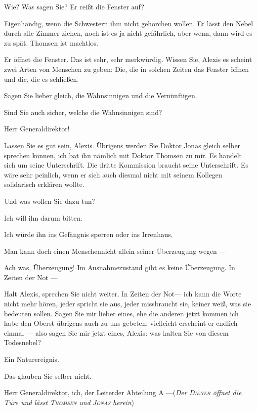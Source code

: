 \documentclass[
	final,
	a4paper,
	ngerman,
	mpinclude = true, %
	twoside = true,
	open = right,
	cleardoublepage = plain,
	DIV = 13,
	BCOR = 1cm,
	titlepage = firstiscover,
	]{scrbook}
\newcommand{\direction}[1]{(\textit{#1})}
\newcommand{\thecharacter}[1]{\textup{\textsc{#1}}\xspace}
\newcommand{\theAlexis}{\thecharacter{Alexis}}
\newcommand{\theThomsen}{\thecharacter{Thomsen}}
\newcommand{\theJonas}{\thecharacter{Jonas}}
\newcommand{\theDiener}{\thecharacter{Diener}}
\newcommand{\character}[1]{\item[#1]}
\newcommand{\Generaldirektor}{\character{Direktor}}
\newcommand{\Alexis}{\character{\theAlexis}}
\begin{document}
\begin{play}
\Generaldirektor
Wie? Was sagen Sie? Er reißt die Fenster auf?

\Alexis
Eigenhändig, wenn die Schwestern ihm nicht gehorchen wollen. Er lässt den Nebel durch alle Zimmer ziehen, noch ist es ja nicht gefährlich, aber wenn, dann wird es zu spät. Thomsen ist machtlos.

\Generaldirektor
Er öffnet die Fenster. Das ist sehr, sehr merkwürdig. Wissen Sie, Alexis es scheint zwei Arten von Menschen zu geben: Die, die in solchen Zeiten das Fenster öffnen und die, die es schließen.

\Alexis
Sagen Sie lieber gleich, die Wahnsinnigen und die Vernünftigen.

\Generaldirektor
Sind Sie auch sicher, welche die Wahnsinnigen sind?

\Alexis
Herr Generaldirektor!

\Generaldirektor
Lassen Sie es gut sein, Alexis. Übrigens werden Sie Doktor Jonas gleich selber sprechen können, ich bat ihn nämlich mit Doktor Thomsen zu mir. Es handelt sich um seine Unterschrift. Die dritte Kommission braucht seine Unterschrift. Es wäre sehr peinlich, wenn er sich auch diesmal nicht mit seinem Kollegen solidarisch erklären wollte.

\Alexis
Und was wollen Sie dazu tun?

\Generaldirektor
Ich will ihn darum bitten.

\Alexis
Ich würde ihn ins Gefängnis sperren oder ins Irrenhaus.

\Generaldirektor
Man kann doch einen Menschennicht allein seiner Überzeugung wegen ---

\Alexis
Ach was, Überzeugung! Im Ausnahmezustand gibt es keine Überzeugung. In Zeiten der Not ---

\Generaldirektor
Halt Alexis, sprechen Sie nicht weiter. In Zeiten der Not--- ich kann die Worte nicht mehr hören, jeder spricht sie aus, jeder missbraucht sie, keiner weiß, was sie bedeuten sollen. Sagen Sie mir lieber eines, ehe die anderen jetzt kommen ich habe den Oberst übrigens auch zu uns gebeten, vielleicht erscheint er endlich einmal --- also sagen Sie mir jetzt eines, Alexis: was halten Sie von diesem Todesnebel?

\Alexis
Ein Naturereignis.

\Generaldirektor
Das glauben Sie selber nicht.

\Alexis
Herr Generaldirektor, ich, der Leiterder Abteilung A ---\direction{Der \theDiener öffnet die Türe und lässt \theThomsen und \theJonas herein}


\end{play}
\end{document}
